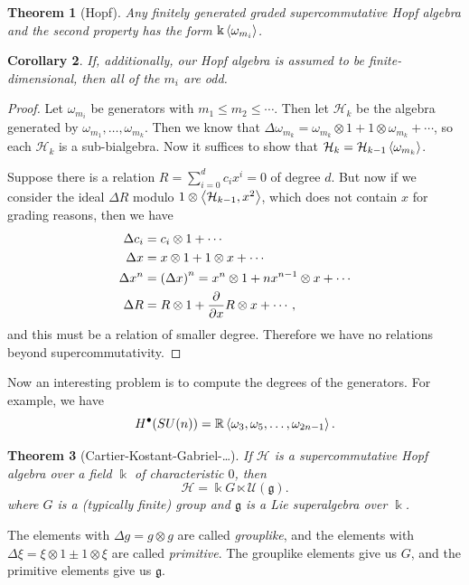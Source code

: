 \documentclass[leqno, openany]{memoir}
\newtheorem{thm}{Theorem}[section]
\newtheorem{cor}[thm]{Corollary}
\theoremstyle{definition}
\theoremstyle{remark}
\theoremstyle{plain}
\theoremstyle{definition}
\theoremstyle{remark}
\newcommand{\R}{\mathbb{R}}
\renewcommand{\k}{\Bbbk}
\newcommand{\mf}[1]{\mathfrak{#1}}
\begin{document}
\begin{thm}[Hopf] Any finitely generated graded supercommutative Hopf algebra
and the second property has the form $\k \ev{\omega_{m_i}}$.  \end{thm}

\begin{cor} If, additionally, our Hopf algebra is assumed to be
finite-dimensional, then all of the $m_i$ are odd.  \end{cor}

\begin{proof} Let $\omega_{m_i}$ be generators with $m_1 \leq m_2 \leq \cdots$.
    Then let $\mathcal{H}_k$ be the algebra generated by $\omega_{m_1}, \ldots,
    \omega_{m_k}$. Then we know that $\Delta \omega_{m_k} = \omega_{m_k}
    \otimes 1 + 1 \otimes \omega_{m_k} + \cdots$, so each $\mathcal{H}_k$ is a
    sub-bialgebra. Now it suffices to show that $\mathcal{H}_k =
    \mathcal{H}_{k-1} \ev{\omega_{m_k}}$.

    Suppose there is a relation $R = \sum_{i=0}^d c_i x^i = 0$ of degree $d$.
    But now if we consider the ideal $\Delta R$ modulo $1 \otimes
    \ev{\mathcal{H}_{k-1}, x^2}$, which does not contain $x$ for grading
    reasons, then we have \begin{align*} \Delta c_i &= c_i \otimes 1 + \cdots
        \\ \Delta x &= x \otimes 1 + 1 \otimes x + \cdots \\ \Delta x^n &=
        {(\Delta x)}^n = x^n \otimes 1 + nx^{n-1} \otimes x + \cdots \\ \Delta
        R &= R \otimes 1 + \pdv{x} R \otimes x + \cdots, \end{align*} and this
    must be a relation of smaller degree. Therefore we have no relations beyond
supercommutativity.  \end{proof}

Now an interesting problem is to compute the degrees of the generators. For
example, we have \[ H^{\bullet}(SU(n)) = \R \ev{\omega_3, \omega_5, \ldots,
\omega_{2n-1}}. \]

\begin{thm}[Cartier-Kostant-Gabriel-\ldots] If $\mathcal{H}$ is a
    supercommutative Hopf algebra over a field $\k$ of characteristic $0$, then
    \[ \mathcal{H} = \k G \ltimes \mathcal{U}(\mf{g}). \] where $G$ is a
    (typically finite) group and $\mf{g}$ is a Lie superalgebra over $\k$.
\end{thm}

The elements with $\Delta g = g \otimes g$ are called \textit{grouplike}, and
the elements with $\Delta \xi = \xi \otimes 1 \pm 1 \otimes \xi$ are called
\textit{primitive}. The grouplike elements give us $G$, and the primitive
elements give us $\mf{g}$. 
\end{document}
